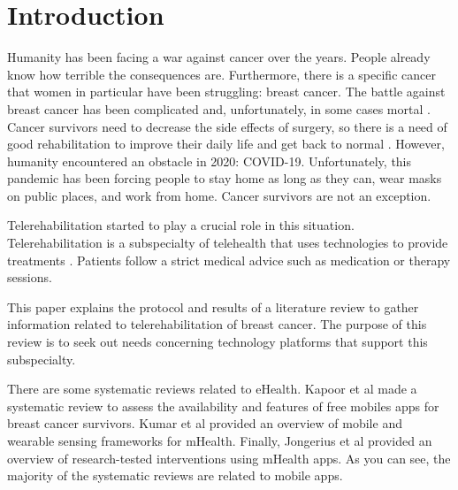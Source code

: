 \documentclass[conference]{IEEEtran}
\begin{document}

\section{Introduction}
Humanity has been facing a war against cancer over the years. People already know how terrible the consequences are. Furthermore, there is a specific cancer that women in particular have been struggling: breast cancer. The battle against breast cancer has been complicated and, unfortunately, in some cases mortal \cite{burbank_knowledge_2006}. Cancer survivors need to decrease the side effects of surgery, so there is a need of good rehabilitation to improve their daily life and get back to normal \cite{de_rezende_telerehabilitation_2021}. However, humanity encountered an obstacle in 2020: COVID-19. Unfortunately, this pandemic has been forcing people to stay home as long as they can, wear masks on public places, and work from home. Cancer survivors are not an exception.

Telerehabilitation started to play a crucial role in this situation. Telerehabilitation is a subspecialty of telehealth that uses technologies to provide treatments \cite{galiano-castillo_agreement_2014, van_der_linden_feasibility_2018}. Patients follow a strict medical advice such as medication or therapy sessions.  

This paper explains the protocol and results of a literature review to gather information related to telerehabilitation of breast cancer. The purpose of this review is to seek out needs concerning technology platforms that support this subspecialty.

There are some systematic reviews related to eHealth. Kapoor et al \cite{kapoor_mobile_2020} made a systematic review to assess the availability and features of free mobiles apps for breast cancer survivors. Kumar et al \cite{kumar_mobile_2021} provided an overview of mobile and wearable sensing frameworks for mHealth. Finally, Jongerius et al \cite{jongerius_research-tested_2019} provided an overview of research-tested interventions using mHealth apps. As you can see, the majority of the systematic reviews are related to mobile apps.
\end{document}
